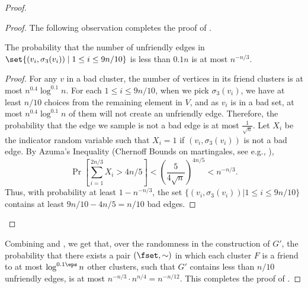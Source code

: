 \begin{proof}
\begin{proof}
The following observation completes the proof of .

\begin{observation}
The probability that the number of unfriendly edges in $\set{(v_i,\sigma_3(v_i))\mid 1\le i\le 9n/10}$ is less than $0.1n$ is at most $n^{-n/3}$.
\end{observation}
\begin{proof}
For any $v$ in a bad cluster, the number of vertices in its friend clusters is at most $n^{0.4} \log^{0.1} n$. 
    For each $1\le i\le 9n/10$, when we pick $\sigma_3(v_i)$, we have at least $n/10$ choices from the remaining element in $V$, and as $v_i$ is in a bad set, at most $n^{0.4} \log^{0.1} n$ of them will not create an unfriendly edge. Therefore, the probability that the edge we sample is not a bad edge is at most $\frac{1}{\sqrt{n}}$. Let $X_i$ be the indicator random variable such that $X_i = 1$ if $(v_i,\sigma_3(v_i))$ is not a bad edge. By Azuma's Inequality (Chernoff Bounds on martingales, see e.g., \cite{kuszmaul2021multiplicative}), 
    $$
        \Pr \left[ \sum_{i=1}^{2n/3} X_i > 4n/5 \right] < \left( \frac{5}{4\sqrt{n}} \right)^{4n/5} < n^{-n/3}.
    $$
    Thus, with probability at least $1-n^{-n/3}$, the set $\{(v_i,\sigma_3(v_i)) | 1 \le i \le 9n/10\}$ contains at least $9n/10-4n/5 = n/10$ bad edges.
\end{proof}
\end{proof}

Combining  and , we get that, over the randomness in the construction of $G'$, the probability that there exists a pair $(\fset,\sim)$ in which each cluster $F$ is a friend to at most $\log^{0.1\eps} n$ other clusters, such that $G'$ contains less than $n/10$ unfriendly edges, is at most $n^{-n/3}\cdot n^{n/4}=n^{-n/12}$.
This completes the proof of .
\end{proof}

